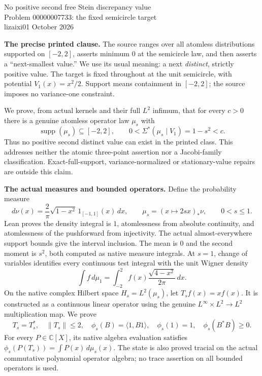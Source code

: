 \documentclass[11pt]{article}
\newcommand{\C}{\mathbb C}
\newcommand{\Sig}{\Sigma^*}
\begin{document}
\begin{center}
{\Large No positive second free Stein discrepancy value}\\[4pt]
{\large Problem 00000007733: the fixed semicircle target}\\[3pt]
lizaixi01 October 2026
\end{center}

\textbf{The precise printed clause.}
The source ranges over all atomless distributions supported on $[-2,2]$,
asserts minimum $0$ at the semicircle law, and then asserts a
``next-smallest value.'' We use its usual meaning: a next \emph{distinct},
strictly positive value. The target is fixed throughout at the unit
semicircle, with potential $V_1(x)=x^2/2$. Support means containment in
$[-2,2]$; the source imposes no variance-one constraint.

We prove, from actual kernels and their full $L^2$ infimum, that for every
$c>0$ there is a genuine atomless operator law $\mu_s$ with
\[
 \operatorname{supp}(\mu_s)\subseteq[-2,2],\qquad
 0<\Sig(\mu_s\mid V_1)=1-s^2<c.
\]
Thus no positive second distinct value can exist in the printed class.
This addresses neither the atomic three-point assertion nor a Jacobi-family
classification. Exact-full-support, variance-normalized or stationary-value
repairs are outside this claim.

\textbf{The actual measures and bounded operators.}
Define the probability measure
\[
 d\nu(x)=\frac2\pi\sqrt{1-x^2}\,1_{[-1,1]}(x)\,dx,
 \qquad \mu_s=(x\mapsto2sx)_*\nu,\qquad 0<s\le1.
\]
Lean proves the density integral is $1$, atomlessness from absolute
continuity, and atomlessness of the pushforward from injectivity. The actual
almost-everywhere support bounds give the interval inclusion. The mean is
$0$ and the second moment is $s^2$, both computed as native measure
integrals. At $s=1$, change of variables identifies every continuous test
integral with the unit Wigner density
\[
 \int f\,d\mu_1=\int_{-2}^2 f(x)\frac{\sqrt{4-x^2}}{2\pi}\,dx.
\]
On the native complex Hilbert space $H_s=L^2(\mu_s)$, let $T_s f(x)=xf(x)$.
It is constructed as a continuous linear operator using the genuine
$L^\infty\times L^2\to L^2$ multiplication map. We prove
\[
 T_s=T_s^*,\quad\|T_s\|\le2,\quad
 \phi_s(B)=\langle1,B1\rangle,\quad\phi_s(1)=1,\quad
 \phi_s(B^*B)\ge0.
\]
For every $P\in\C[X]$, its native algebra evaluation satisfies
$\phi_s(P(T_s))=\int P(x)\,d\mu_s(x)$. The state is also proved tracial on
the actual commutative polynomial operator algebra; no trace assertion on
all bounded operators is used.
\end{document}
